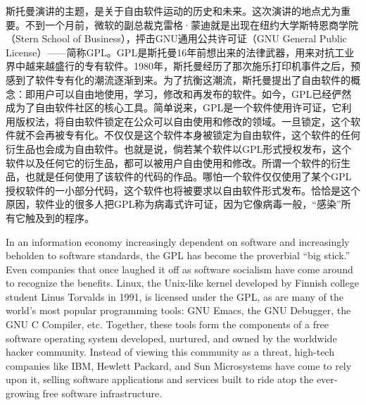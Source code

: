 \ifdefined\chs
斯托曼演讲的主题，是关于自由软件运动的历史和未来。这次演讲的地点尤为重要。不到一个月前，微软的副总裁克雷格·蒙迪就是出现在纽约大学斯特恩商学院（Stern School of Business），抨击GNU通用公共许可证（GNU General Public License）——简称GPL。GPL是斯托曼16年前想出来的法律武器，用来对抗工业界中越来越盛行的专有软件。1980年，斯托曼经历了那次施乐打印机事件之后，预感到了软件专有化的潮流逐渐到来。为了抗衡这潮流，斯托曼提出了自由软件的概念：即用户可以自由地使用，学习，修改和再发布的软件。如今，GPL已经俨然成为了自由软件社区的核心工具。简单说来，GPL是一个软件使用许可证，它利用版权法，将自由软件锁定在公众可以自由使用和修改的领域。一旦锁定，这个软件就不会再被专有化。不仅仅是这个软件本身被锁定为自由软件，这个软件的任何衍生品也会成为自由软件。也就是说，倘若某个软件以GPL形式授权发布，这个软件以及任何它的衍生品，都可以被用户自由使用和修改。所谓一个软件的衍生品，也就是任何使用了该软件的代码的作品。哪怕一个软件仅仅使用了某个GPL授权软件的一小部分代码，这个软件也将被要求以自由软件形式发布。恰恰是这个原因，软件业的很多人把GPL称为病毒式许可证，因为它像病毒一般，``感染''所有它触及到的程序。


\fi

\ifdefined\eng
In an information economy increasingly dependent on software and increasingly beholden to software standards, the GPL has become the proverbial ``big stick.'' Even companies that once laughed it off as software socialism have come around to recognize the benefits. Linux, the Unix-like kernel developed by Finnish college student Linus Torvalds in 1991, is licensed under the GPL, as are many of the world's most popular programming tools: GNU Emacs, the GNU Debugger, the GNU C Compiler, etc. Together, these tools form the components of a free software operating system developed, nurtured, and owned by the worldwide hacker community. Instead of viewing this community as a threat, high-tech companies like IBM, Hewlett Packard, and Sun Microsystems have come to rely upon it, selling software applications and services built to ride atop the ever-growing free software infrastructure.
\fi

